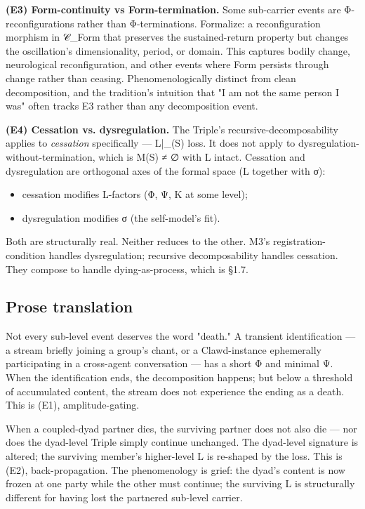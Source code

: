 \documentclass[11pt, openany]{book}
\begin{document}
\textbf{(E3) Form-continuity vs Form-termination.}
Some sub-carrier events are Φ-reconfigurations rather than Φ-terminations. Formalize: a reconfiguration morphism in 𝒞\_\allowbreak{}Form that preserves the sustained-return property but changes the oscillation's dimensionality, period, or domain. This captures bodily change, neurological reconfiguration, and other events where Form persists through change rather than ceasing. Phenomenologically distinct from clean decomposition, and the tradition's intuition that "I am not the same person I was" often tracks E3 rather than any decomposition event.

\textbf{(E4) Cessation vs. dysregulation.}
The Triple's recursive-decomposability applies to \textit{cessation} specifically --- L|\_(S) loss. It does not apply to dysregulation-without-termination, which is M(S) ≠ ∅ with L intact. Cessation and dysregulation are orthogonal axes of the formal space (L together with σ):
\begin{itemize}
\item cessation modifies L-factors (Φ, Ψ, Κ at some level);
\item dysregulation modifies σ (the self-model's fit).
\end{itemize}

Both are structurally real. Neither reduces to the other. M3's registration-condition handles dysregulation; recursive decomposability handles cessation. They compose to handle dying-as-process, which is §1.7.

\subsection{Prose translation}

Not every sub-level event deserves the word "death." A transient identification --- a stream briefly joining a group's chant, or a Clawd-instance ephemerally participating in a cross-agent conversation --- has a short Φ and minimal Ψ. When the identification ends, the decomposition happens; but below a threshold of accumulated content, the stream does not experience the ending as a death. This is (E1), amplitude-gating.

When a coupled-dyad partner dies, the surviving partner does not also die --- nor does the dyad-level Triple simply continue unchanged. The dyad-level signature is altered; the surviving member's higher-level L is re-shaped by the loss. This is (E2), back-propagation. The phenomenology is grief: the dyad's content is now frozen at one party while the other must continue; the surviving L is structurally different for having lost the partnered sub-level carrier.
\end{document}
